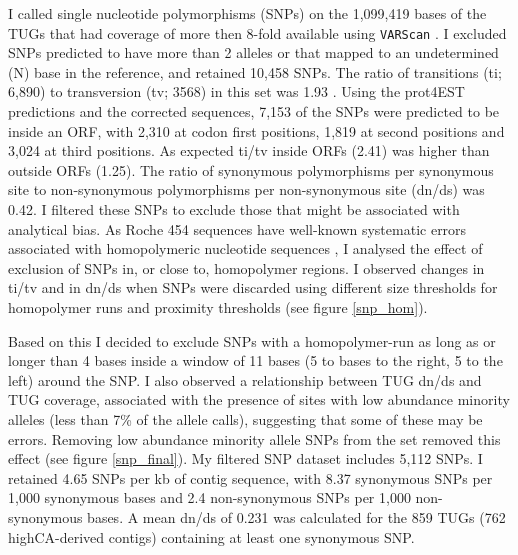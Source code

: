 I called single nucleotide polymorphisms (SNPs) on the 1,099,419 bases
of the TUGs that had coverage of more then 8-fold available using
\texttt{VARScan} \cite{pmid19542151}. I excluded SNPs predicted to
have more than 2 alleles or that mapped to an undetermined (N) base in
the reference, and retained 10,458 SNPs. The ratio of transitions (ti;
6,890) to transversion (tv; 3568) in this set was 1.93 . Using the
prot4EST predictions and the corrected sequences, 7,153 of the SNPs
were predicted to be inside an ORF, with 2,310 at codon first
positions, 1,819 at second positions and 3,024 at third positions. As
expected ti/tv inside ORFs (2.41) was higher than outside ORFs
(1.25). The ratio of synonymous polymorphisms per synonymous site to
non-synonymous polymorphisms per non-synonymous site (dn/ds) was
0.42. I filtered these SNPs to exclude those that might be associated
with analytical bias. As Roche 454 sequences have well-known
systematic errors associated with homopolymeric nucleotide sequences
\cite{pmid21685085}, I analysed the effect of exclusion of SNPs in, or
close to, homopolymer regions. I observed changes in ti/tv and in
dn/ds when SNPs were discarded using different size thresholds for
homopolymer runs and proximity thresholds (see figure \ref{snp_hom}).


Based on this I decided to exclude SNPs with a homopolymer-run as long
as or longer than 4 bases inside a window of 11 bases (5 to bases to
the right, 5 to the left) around the SNP. I also observed a
relationship between TUG dn/ds and TUG coverage, associated with the
presence of sites with low abundance minority alleles (less than 7\%
of the allele calls), suggesting that some of these may be errors.
Removing low abundance minority allele SNPs from the set removed this
effect (see figure \ref{snp_final}). My filtered SNP dataset
includes 5,112 SNPs. I retained 4.65 SNPs per kb of contig sequence,
with 8.37 synonymous SNPs per 1,000 synonymous bases and 2.4
non-synonymous SNPs per 1,000 non-synonymous bases. A mean dn/ds of
0.231 was calculated for the 859 TUGs (762 highCA-derived contigs)
containing at least one synonymous SNP.

